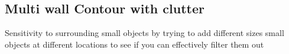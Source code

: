 \begin{figure}[h!t]
\end{figure}

\begin{figure}[h!t]
\end{figure}

\subsection{Multi wall Contour with clutter}

Sensitivity to surrounding small objects by trying to add different sizes small objects at different locations to see if you can effectively filter them out 